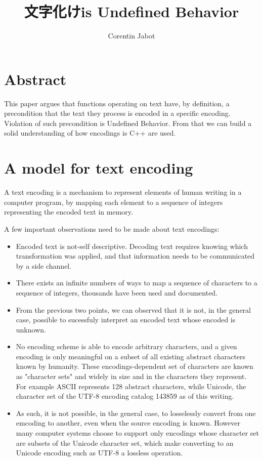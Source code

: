 \documentclass{wg21}
\title{文字化け\footnotemark is Undefined Behavior}
\author{Corentin Jabot}{corentin.jabot@gmail.com}
\let\ACMmaketitle=\maketitle
\renewcommand{\maketitle}{\begingroup\let\footnote=\thanks \ACMmaketitle\endgroup}
\begin{document}
\maketitle



\section{Abstract}

This paper argues that functions operating on text have, by definition, a precondition that the text they process is
encoded in a specific encoding. Violation of such precondition is Undefined Behavior.
From that we can build a solid understanding of how encodings is C++ are used.

\section{A model for text encoding}

A text encoding is a mechanism to represent elements of human writing in a computer program,
by mapping each element to a sequence of integers representing the encoded text in memory.

A few important observations need to be made about text encodings:
\begin{itemize}
\item Encoded text is not-self descriptive. Decoding text requires knowing which transformation was applied, and that information needs to be communicated by a side channel.
\item There exists an infinite numbers of ways to map a sequence of characters to a sequence of integers, thousands have been used and documented. 
\item From the previous two points, we can observed that it is not, in the general case, possible to sucessfuly interpret an encoded text whose encoded is unknown.
\item No encoding scheme is able to encode arbitrary characters, and a given encoding is only meaningful on a subset of all existing abstract characters known by humanity. These encodings-dependent set of characters are known as "character sets" and widely in size and in the characters they represent. For example ASCII represents 128 abstract characters, while Unicode, the character set of the UTF-8 encoding catalog 143859 as of this writing.
\item As such, it is not possible, in the general case, to losselessly convert from one emcoding to another, even when the source encoding is known. However many computer systems choose to support only encodings whose character set are subsets of the Unicode character set, which make converting to an Unicode encoding such as UTF-8 a lossless operation.
\end{itemize}
\end{document}
